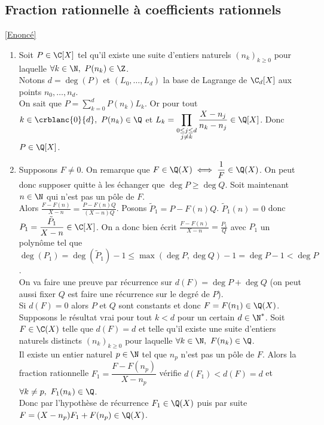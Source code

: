\documentclass{book}
\begin{document}
	\subsection{Fraction rationnelle à coefficients rationnels }
	\label{Fraction rationnelle à coefficients rationnels corrigé}
	\textcolor{blue}{\hyperref[Fraction rationnelle à coefficients rationnels]{[Enoncé]}}\\
	\begin{enumerate}[leftmargin=*]
		\item Soit $P\in \C[X]$ tel qu'il existe une suite d'entiers naturels $(n_k)_{k\geq 0}$ pour laquelle $\forall k\in \N,\ P(n_k)\in \Z$.\\
		Notons $d=\deg(P)$ et $(L_0,\dots,L_d)$ la base de Lagrange de $\C_d[X]$ aux points $n_0,\dots,n_d$.\\
		On sait que $P=\displaystyle\sum_{k=0}^dP(n_k)L_k$. Or pour tout $k\in \crblanc{0}{d},\ P(n_k)\in \Q$ et $L_k=\displaystyle\prod_{\substack{0\leq j\leq d\\j\ne k}}{\frac{X-n_j}{n_k-n_j}}\in \Q[X]$. Donc $P\in \Q[X]$.
		\item Supposons $F\ne 0$. On remarque que $F\in \Q(X)\iff \dfrac{1}{F}\in \Q(X)$. On peut donc supposer quitte à les échanger que $\deg P\geq \deg Q$. Soit maintenant $n\in \N$ qui n'est pas un pôle de $F$.\\
		Alors $\displaystyle\frac{F-F(n)}{X-n}=\frac{P-F(n)Q}{(X-n)Q}$. Posons $\tilde P_1=P-F(n)Q$. $\tilde P_1(n)=0$ donc $P_1=\dfrac{\tilde P_1}{X-n}\in \C[X]$. On a donc bien écrit $\displaystyle\frac{F-F(n)}{X-n}=\frac{P_1}{Q}$ avec $P_1$ un polynôme tel que $\deg(P_1)=\deg(\tilde P_1)-1\leq \max(\deg P,\deg Q)-1=\deg P-1<\deg P$.\\
		On va faire une preuve par récurrence sur $d(F)=\deg P+\deg Q$ (on peut aussi fixer $Q$ est faire une récurrence sur le degré de $P$).\\
		Si $d(F)=0$ alors $P$ et $Q$ sont constants et donc $F=F(n_1)\in \Q(X)$.\\
		Supposons le résultat vrai pour tout $k<d$ pour un certain $d\in \N^*$. Soit $F\in \C(X)$ telle que $d(F)=d$ et telle qu'il existe une suite d'entiers naturels distincts $(n_k)_{k\geq 0}$ pour laquelle $\forall k\in \N,\ F(n_k)\in \Q$.\\
		Il existe un entier naturel $p\in \N$ tel que $n_p$ n'est pas un pôle de $F$. Alors la fraction rationnelle $F_1=\dfrac{F-F(n_p)}{X-n_p}$ vérifie $d(F_1)<d(F)=d$ et $\forall k\ne p,\ F_1(n_k)\in \Q$.\\
		Donc par l'hypothèse de récurrence $F_1\in \Q(X)$ puis par suite $F=(X-n_p)F_1+F(n_p)\in \Q(X)$.
	\end{enumerate}
	
\end{document}
